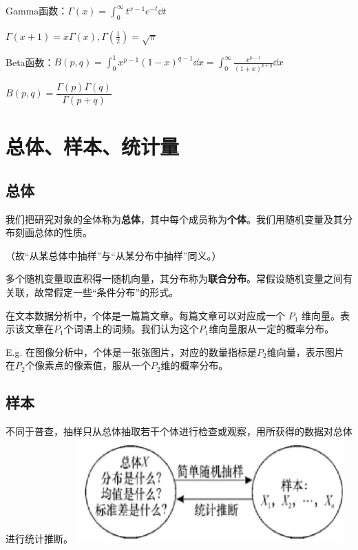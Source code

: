 \documentclass[UTF-8]{ctexbeamer}
\begin{document}
\begin{frame}
  Gamma函数：$\Gamma(x)=\int_{0}^{\infty}t^{x-1}e^{-t}\dd t$

  $\Gamma(x+1)=x\Gamma(x),\Gamma(\frac{1}{2})=\sqrt{\pi}$

  Beta函数：$B(p,q)=\int_{0}^{1}x^{p-1}(1-x)^{q-1}\dd x=\int_{0}^{\infty}\frac{x^{p-1}}{(1+x)^{p+q}}\dd x$

  $B(p,q)=\dfrac{\Gamma(p)\Gamma(q)}{\Gamma(p+q)}$
\end{frame}
\section{总体、样本、统计量}

\subsection{总体}
\begin{frame}
  我们把研究对象的全体称为\textbf{总体}，其中每个成员称为\textbf{个体}。我们用随机变量及其分布刻画总体的性质。

（故“从某总体中抽样”与“从某分布中抽样”同义。）

多个随机变量取直积得一随机向量，其分布称为\textbf{联合分布}。常假设随机变量之间有关联，故常假定一些“条件分布”的形式。
\begin{Eg}
在文本数据分析中，个体是一篇篇文章。每篇文章可以对应成一个 $P_1$ 维向量。表示该文章在$P_1$个词语上的词频。我们认为这个$ P_1$维向量服从一定的概率分布。
\end{Eg}
\begin{Eg}
  E.g. 在图像分析中，个体是一张张图片，对应的数量指标是$ P_2$维向量，表示图片在$ P_2$个像素点的像素值，服从一个$ P_2$维的概率分布。
  \end{Eg}
\end{frame}

\subsection{样本}

\begin{frame}
  不同于普查，抽样只从总体抽取若干个体进行检查或观察，用所获得的数据对总体进行统计推断。
  \includegraphics{sample.png}
\end{frame}
\end{document}
